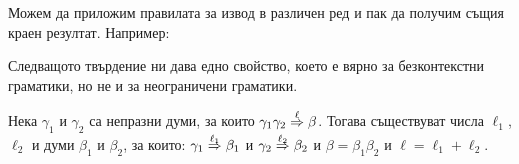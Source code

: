 \begin{extra}
\begin{example}
\begin{prooftree}
  \end{prooftree}
  Можем да приложим правилата за извод в различен ред и пак да получим същия краен резултат.
  Например:
  \begin{prooftree}
  \end{prooftree}
\end{example}
\end{extra}


Следващото твърдение ни дава едно свойство, което е вярно за безконтекстни граматики, но не и за неограничени граматики.
\begin{proposition}\label{pr:grammar:divide-2}
  Нека $\gamma_1$ и $\gamma_2$ са непразни думи, за които $\gamma_1\gamma_2 \derive{\ell} \beta$. Тогава
  съществуват числа $\ell_1$, $\ell_2$ и думи $\beta_1$ и $\beta_2$, за които:
  $\gamma_1 \derive{\ell_1} \beta_1$ и $\gamma_2 \derive{\ell_2} \beta_2$ и $\beta = \beta_1\beta_2$ и $\ell = \ell_1 + \ell_2$.
\end{proposition}
